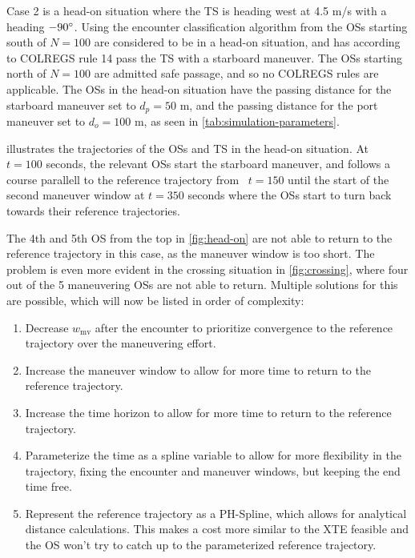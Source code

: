 Case 2 is a head-on situation where the TS is heading west at 4.5 m/s with a heading $-90\degree$. Using the encounter classification algorithm from \cite{Thyri2022-Confined-Waters} the OSs starting south of $N=100$ are considered to be in a head-on situation, and has according to COLREGS rule 14 pass the TS with a starboard maneuver. The OSs starting north of $N=100$ are admitted safe passage, and so no COLREGS rules are applicable. The OSs in the head-on situation have the passing distance for the starboard maneuver set to $d_p=50$ m, and the passing distance for the port maneuver set to $d_o=100$ m, as seen in \cref{tab:simulation-parameters}.  

 illustrates the trajectories of the OSs and TS in the head-on situation. At ~$t=100$ seconds, the relevant OSs start the starboard maneuver, and follows a course parallell to the reference trajectory from ~$t=150$ until the start of the second maneuver window at $t=350$ seconds where the OSs start to turn back towards their reference trajectories. 

The 4th and 5th OS from the top in \cref{fig:head-on} are not able to return to the reference trajectory in this case, as the maneuver window is too short. The problem is even more evident in the crossing situation in \cref{fig:crossing}, where four out of the 5 maneuvering OSs are not able to return. Multiple solutions for this are possible, which will now be listed in order of complexity:
\begin{enumerate}
    \item Decrease $w_\text{mv}$ after the encounter to prioritize convergence to the reference trajectory over the maneuvering effort.
    \item Increase the maneuver window to allow for more time to return to the reference trajectory.
    \item Increase the time horizon to allow for more time to return to the reference trajectory.
    \item Parameterize the time as a spline variable to allow for more flexibility in the trajectory, fixing the encounter and maneuver windows, but keeping the end time free.
    \item Represent the reference trajectory as a PH-Spline, which allows for analytical distance calculations. This makes a cost more similar to the XTE feasible and the OS won't try to catch up to the parameterized reference trajectory.
\end{enumerate}


